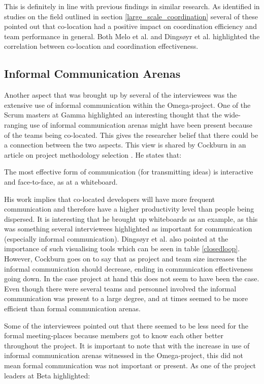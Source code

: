 This is definitely in line with previous findings in similar research. As identified in studies on the field outlined in section \ref{large_scale_coordination} several of these pointed out that co-location had a positive impact on coordination efficiency and team performance in general. Both Melo et al. \cite{Melo2013} and Dingsøyr et al. \cite{Dingsoyr2013c} highlighted the correlation between co-location and coordination effectiveness.

\subsection{Informal Communication Arenas}

Another aspect that was brought up by several of the interviewees was the extensive use of informal communication within the Omega-project. One of the Scrum masters at Gamma highlighted an interesting thought that the wide-ranging use of informal communication arenas might have been present because of the teams being co-located. This gives the researcher belief that there could be a connection between the two aspects. This view is shared by Cockburn in an article on project methodology selection \cite{Cockburn2000}. He states that:

\begin{fancyquotes}
The most effective form of communication (for transmitting ideas) is interactive and face-to-face, as at a whiteboard.
\end{fancyquotes}

His work implies that co-located developers will have more frequent communication and therefore have a higher productivity level than people being dispersed. It is interesting that he brought up whiteboards as an example, as this was something several interviewees highlighted as important for communication (especially informal communication). Dingsøyr et al. \cite{Dingsoyr2013c} also pointed at the importance of such visualising tools which can be seen in table \ref{closedloop}. However, Cockburn goes on to say that as project and team size increases the informal communication should decrease, ending in communication effectiveness going down. In the case project at hand this does not seem to have been the case. Even though there were several teams and personnel involved the informal communication was present to a large degree, and at times seemed to be more efficient than formal communication arenas.

Some of the interviewees pointed out that there seemed to be less need for the formal meeting-places because members got to know each other better throughout the project. It is important to note that with the increase in use of informal communication arenas witnessed in the Omega-project, this did not mean formal communication was not important or present. As one of the project leaders at Beta highlighted:

